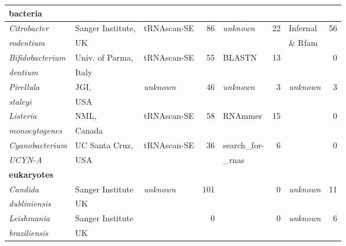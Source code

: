 \begin{footnotesize}
\begin{center}
\begin{table}
\begin{tabular}{|ll|lr|lr|lr|}
\multicolumn{8}{l}{\textbf{bacteria}} \\ \hline
\emph{Citrobacter}                       & Sanger Institute, & tRNAscan-SE   & 86       & \emph{unknown} & 22 & Infernal       & 56       \\
\emph{rodentium}                         & UK                &               &          &                &    & \& Rfam        &          \\ \hline
\emph{Bifidobacterium}                   & Univ. of Parma,   & tRNAscan-SE   & 55       & BLASTN         & 13 &                &  0       \\
\emph{dentium}                           & Italy             &               &          &                &    &                &          \\ \hline
\emph{Pirellula}                         & JGI,              &\emph{unknown} & 46       & \emph{unknown} &  3 & \emph{unknown} & 3        \\
\emph{staleyi}                           & USA               &               &          &                &    &                &          \\ \hline %
\emph{Listeria}                          & NML,              & tRNAscan-SE   & 58       & RNAmmer        & 15 &                & 0        \\
\emph{monocytogenes}                     & Canada            &               &          &                &    &                &          \\ \hline
\emph{Cyanobacterium}                    & UC Santa Cruz,    & tRNAscan-SE   & 36       & search\_for-   & 6  &                & 0        \\
\emph{UCYN-A}                            & USA               &               &          & \_rnas         &    &                &          \\ \hline
\multicolumn{8}{l}{\textbf{eukaryotes}} \\ \hline
\emph{Candida}                           & Sanger Institute  &\emph{unknown} &     101  &                & 0  & \emph{unknown} & 11       \\
\emph{dubliniensis}                      & UK                &               &          &                &    &                &          \\ \hline
\emph{Leishmania}                        & Sanger Institute  &               &       0  &                &  0 & \emph{unknown} & 6        \\
\emph{braziliensis}                      & UK                &               &          &                &    &                &          \\ \hline

\end{tabular}
\end{table}
\end{center}
\end{footnotesize}
